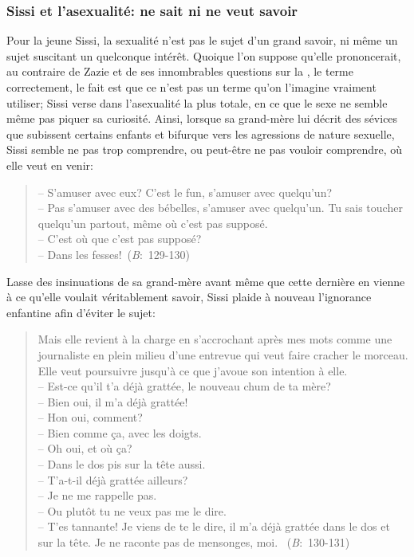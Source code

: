 \subsubsection{Sissi et l'asexualité: ne sait ni ne veut savoir}
Pour la jeune Sissi, la sexualité n'est pas le sujet d'un grand savoir, ni même un sujet suscitant un quelconque intérêt.
Quoique l'on suppose qu'elle prononcerait, au contraire de Zazie et de ses innombrables questions sur la , le terme  correctement, le fait est que ce n'est pas un terme qu'on l'imagine vraiment utiliser; Sissi verse dans l'asexualité la plus totale, en ce que le sexe ne semble même pas piquer sa curiosité.
Ainsi, lorsque sa grand-mère lui décrit des sévices que subissent certains enfants et bifurque vers les agressions de nature sexuelle, Sissi semble ne pas trop comprendre, ou peut-être ne pas vouloir comprendre, où elle veut en venir:
\begin{quote}
  \begin{singlespace}
    \small
    -- S'amuser avec eux? C'est le fun, s'amuser avec quelqu'un? \\
    -- Pas s'amuser avec des bébelles, s'amuser avec quelqu'un. Tu sais toucher quelqu'un partout, même où c'est pas supposé. \\
    -- C'est où que c'est pas supposé? \\
    -- Dans les fesses!~(\textit{B}:~129-130)
    \normalsize
  \end{singlespace}
\end{quote}
Lasse des insinuations de sa grand-mère avant même que cette dernière en vienne à ce qu'elle voulait véritablement savoir, Sissi plaide à nouveau l'ignorance enfantine afin d'éviter le sujet:
\begin{quote}
  \begin{singlespace}
    \small
    Mais elle revient à la charge en s'accrochant après mes mots comme une journaliste en plein milieu d'une entrevue qui veut faire cracher le morceau. Elle veut poursuivre jusqu'à ce que j'avoue son intention à elle. \\
    -- Est-ce qu'il t'a déjà grattée, le nouveau chum de ta mère? \\
    -- Bien oui, il m'a déjà grattée! \\
    -- Hon oui, comment? \\
    -- Bien comme ça, avec les doigts. \\
    -- Oh oui, et où ça? \\
    -- Dans le dos pis sur la tête aussi. \\
    -- T'a-t-il déjà grattée ailleurs? \\
    -- Je ne me rappelle pas. \\
    -- Ou plutôt tu ne veux pas me le dire. \\
    -- T'es tannante! Je viens de te le dire, il m'a déjà grattée dans le dos et sur la tête. Je ne raconte pas de mensonges, moi. ~(\textit{B}:~130-131)
    \normalsize
  \end{singlespace}
\end{quote}
